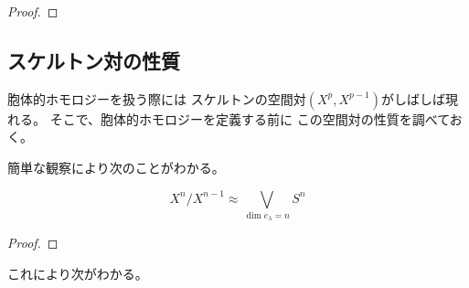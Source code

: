 \documentclass[report]{jlreq}
\begin{document}
\begin{proof}
    \TODO{}
\end{proof}

\subsection{スケルトン対の性質}

胞体的ホモロジーを扱う際には
スケルトンの空間対$(X^p, X^{p - 1})$がしばしば現れる。
そこで、胞体的ホモロジーを定義する前に
この空間対の性質を調べておく。

簡単な観察により次のことがわかる。

\begin{lemma}
    \begin{equation}
        X^n / X^{n - 1} \approx \bigvee_{\dim e_\lambda = n} S^n
    \end{equation}
    \TODO{}
\end{lemma}

\begin{proof}
    \TODO{}
\end{proof}

これにより次がわかる。

\end{document}
